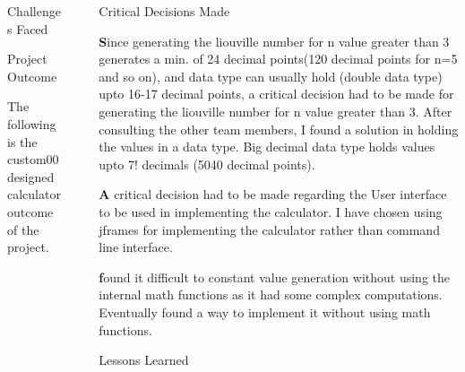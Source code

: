 \documentclass[final]{beamer}
\newlength{\sepwidth}
\newlength{\colwidth}
\newcommand{\separatorcolumn}{\begin{column}{\sepwidth}\end{column}}
\begin{document}
\begin{frame}[t]
\begin{columns}[t]
\begin{column}{\colwidth}
\begin{block}{Challenges Faced}
  \end{block}

  \begin{block}{Project Outcome}

   The following is the custom00 designed calculator outcome of the project.
\begin{figure}[!http]
    \centering
\end{figure}

  \end{block}

  
\end{column}

\separatorcolumn

\begin{column}{\colwidth}

  \begin{alertblock}{Critical Decisions Made}

\item \textbf Since generating the liouville number for n value greater than 3 generates a min. of 24 decimal points(120 decimal points for n=5 and so on), and data type can usually hold (double data type) upto 16-17 decimal points, a critical decision had to be made for generating the liouville number for n value greater than 3. After consulting the other team members, I found a solution in holding the values in a data type. Big decimal data type holds values upto 7! decimals (5040 decimal points).
 \item \textbf A critical decision had to be made regarding the User interface to be used in implementing the calculator. I have chosen using jframes for implementing the calculator rather than command line interface. 
 \item \textbf found it difficult to constant value generation  without using the internal math functions as it had some complex computations. Eventually found a way to implement it without using math functions.  
  \end{alertblock}

  \begin{block}{Lessons Learned}


\end{block}
\end{column}
\end{columns}
\end{frame}
\end{document}
